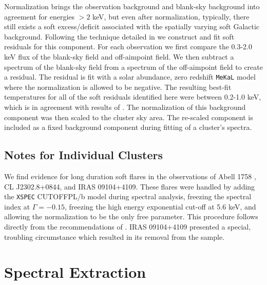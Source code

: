 \documentclass{emulateapj}
\begin{document}
Normalization brings the observation background and blank-sky
background into agreement for energies $> 2$ keV, but even after
normalization, typically, there still exists a soft excess/deficit
associated with the spatially varying soft Galactic
background. Following the technique detailed in
\cite{2005ApJ...628..655V} we construct and fit soft residuals for
this component. For each observation we first compare the 0.3-2.0 keV
flux of the blank-sky field and off-aimpoint field. We then
subtract a spectrum of the blank-sky field from a spectrum of the
off-aimpoint field to create a residual. The residual is fit
with a solar abundance, zero redshift {\tt MeKaL} model
\citep{1985A&AS...62..197M, 1986A&AS...65..511M, 1992SRON,
1995ApJ...438L.115L} where the normalization is allowed to be
negative. The resulting best-fit temperatures for all of the soft
residuals identified here were between 0.2-1.0 keV, which is in
agreement with results of \cite{2005ApJ...628..655V}. The
normalization of this background component was then scaled to the
cluster sky area. The re-scaled component is included as a fixed
background component during fitting of a cluster's spectra.

\subsection{Notes for Individual Clusters} \label{sec:indnotes}

We find evidence for long duration soft flares in the observations of
Abell 1758 \citep{2004ApJ...613..831D}, CL J2302.8+0844, and IRAS
09104+4109. These flares were handled by adding the {\tt XSPEC}
CUTOFFPL/b model during spectral analysis, freezing the spectral index
at $\Gamma=-0.15$, freezing the high energy exponential cut-off at 5.6
keV, and allowing the normalization to be the only free
parameter. This procedure follows directly from the recommendations of
\cite{2003ApJ...583...70M}. IRAS 09104+4109 presented a special, 
troubling circumstance which resulted in its removal from the sample.

\section{Spectral Extraction} \label{sec:extraction}
\end{document}
